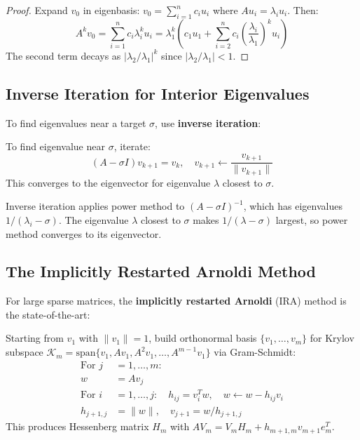 \begin{proof}
Expand $v_0$ in eigenbasis: $v_0 = \sum_{i=1}^n c_i u_i$ where $Au_i = \lambda_i u_i$. Then:
\begin{equation}
A^k v_0 = \sum_{i=1}^n c_i \lambda_i^k u_i = \lambda_1^k \left(c_1 u_1 + \sum_{i=2}^n c_i \left(\frac{\lambda_i}{\lambda_1}\right)^k u_i\right)
\end{equation}
The second term decays as $|\lambda_2/\lambda_1|^k$ since $|\lambda_2/\lambda_1| < 1$.
\end{proof}

\subsection{Inverse Iteration for Interior Eigenvalues}

To find eigenvalues near a target $\sigma$, use \textbf{inverse iteration}:

\begin{defn}\label{def:inverse-iteration}
To find eigenvalue near $\sigma$, iterate:
\begin{equation}
(A - \sigma I) v_{k+1} = v_k, \quad v_{k+1} \leftarrow \frac{v_{k+1}}{\|v_{k+1}\|}
\end{equation}
This converges to the eigenvector for eigenvalue $\lambda$ closest to $\sigma$.
\end{defn}

\begin{remark}
Inverse iteration applies power method to $(A - \sigma I)^{-1}$, which has eigenvalues $1/(\lambda_i - \sigma)$. The eigenvalue $\lambda$ closest to $\sigma$ makes $1/(\lambda - \sigma)$ largest, so power method converges to its eigenvector.
\end{remark}

\subsection{The Implicitly Restarted Arnoldi Method}

For large sparse matrices, the \textbf{implicitly restarted Arnoldi} (IRA) method is the state-of-the-art:

\begin{defn}\label{def:arnoldi}
Starting from $v_1$ with $\|v_1\| = 1$, build orthonormal basis $\{v_1, \ldots, v_m\}$ for Krylov subspace $\mathcal{K}_m = \text{span}\{v_1, Av_1, A^2v_1, \ldots, A^{m-1}v_1\}$ via Gram-Schmidt:
\begin{align}
\text{For } j &= 1, \ldots, m: \\
w &= A v_j \\
\text{For } i &= 1, \ldots, j: \quad h_{ij} = v_i^T w, \quad w \leftarrow w - h_{ij} v_i \\
h_{j+1,j} &= \|w\|, \quad v_{j+1} = w/h_{j+1,j}
\end{align}
This produces Hessenberg matrix $H_m$ with $A V_m = V_m H_m + h_{m+1,m} v_{m+1} e_m^T$.
\end{defn}

